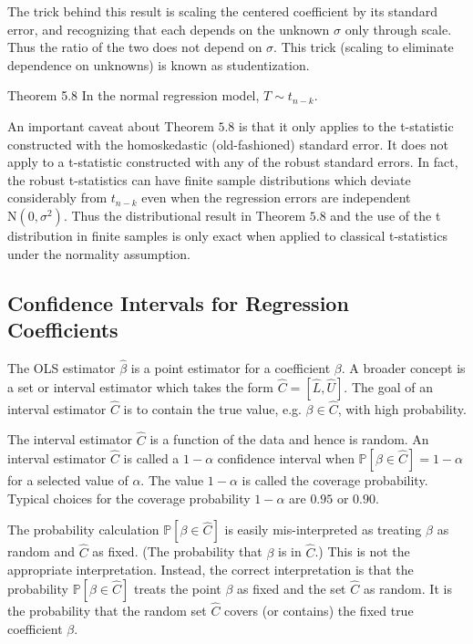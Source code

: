 \documentclass[10pt]{article}
\begin{document}
The trick behind this result is scaling the centered coefficient by its standard error, and recognizing that each depends on the unknown $\sigma$ only through scale. Thus the ratio of the two does not depend on $\sigma$. This trick (scaling to eliminate dependence on unknowns) is known as studentization.

Theorem 5.8 In the normal regression model, $T \sim t_{n-k}$.

An important caveat about Theorem $5.8$ is that it only applies to the t-statistic constructed with the homoskedastic (old-fashioned) standard error. It does not apply to a t-statistic constructed with any of the robust standard errors. In fact, the robust t-statistics can have finite sample distributions which deviate considerably from $t_{n-k}$ even when the regression errors are independent $\mathrm{N}\left(0, \sigma^{2}\right)$. Thus the distributional result in Theorem $5.8$ and the use of the t distribution in finite samples is only exact when applied to classical t-statistics under the normality assumption.

\subsection{Confidence Intervals for Regression Coefficients}
The OLS estimator $\widehat{\beta}$ is a point estimator for a coefficient $\beta$. A broader concept is a set or interval estimator which takes the form $\widehat{C}=[\widehat{L}, \widehat{U}]$. The goal of an interval estimator $\widehat{C}$ is to contain the true value, e.g. $\beta \in \widehat{C}$, with high probability.

The interval estimator $\widehat{C}$ is a function of the data and hence is random. An interval estimator $\widehat{C}$ is called a $1-\alpha$ confidence interval when $\mathbb{P}[\beta \in \widehat{C}]=1-\alpha$ for a selected value of $\alpha$. The value $1-\alpha$ is called the coverage probability. Typical choices for the coverage probability $1-\alpha$ are $0.95$ or $0.90$.

The probability calculation $\mathbb{P}[\beta \in \widehat{C}]$ is easily mis-interpreted as treating $\beta$ as random and $\widehat{C}$ as fixed. (The probability that $\beta$ is in $\widehat{C}$.) This is not the appropriate interpretation. Instead, the correct interpretation is that the probability $\mathbb{P}[\beta \in \widehat{C}]$ treats the point $\beta$ as fixed and the set $\widehat{C}$ as random. It is the probability that the random set $\widehat{C}$ covers (or contains) the fixed true coefficient $\beta$.
\end{document}

